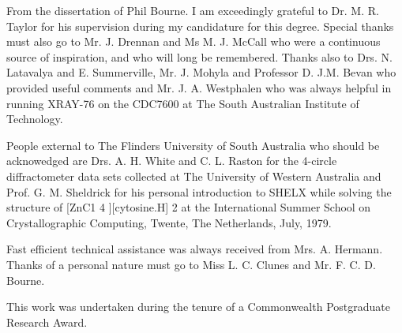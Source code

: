 From the dissertation of Phil Bourne.  I am exceedingly grateful to Dr. M. R. Taylor for his supervision during my candidature for this degree. Special thanks must also go to Mr. J. Drennan and Ms M. J. McCall who were a continuous source of inspiration, and who will long be remembered. Thanks also to Drs. N. Latavalya and E. Summerville, Mr. J. Mohyla and Professor D. J.M. Bevan who provided useful comments and Mr. J. A. Westphalen who was always helpful in running XRAY-76 on the CDC7600 at The South Australian Institute of Technology.

People external to The Flinders University of South Australia who should be acknowedged are Drs. A. H. White and C. L. Raston for the 4-circle diffractometer data sets collected at The University of Western Australia and Prof. G. M. Sheldrick for his personal introduction to SHELX while solving the structure of [ZnC1 4 ][cytosine.H] 2 at the International Summer School on Crystallographic Computing, Twente, The Netherlands, July, 1979.

Fast efficient technical assistance was always received from Mrs. A. Hermann. Thanks of a personal nature must go to Miss L. C. Clunes and Mr. F. C. D. Bourne. 

This work was undertaken during the tenure of a Commonwealth Postgraduate Research Award.
